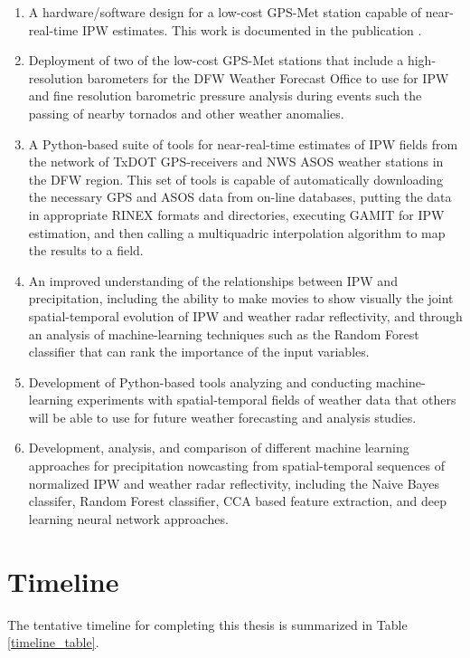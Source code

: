 \documentclass[proposal]{umassthesis}
\begin{document}
{\begin{enumerate}
\item A hardware/software design for a low-cost GPS-Met station capable of near-real-time IPW estimates. This work is documented in the publication \cite{nagarajan2015lowcost}.
\item Deployment of two of the low-cost GPS-Met stations that include a high-resolution barometers for the DFW Weather Forecast Office to use for IPW and fine resolution barometric pressure analysis during events such the passing of nearby tornados and other weather anomalies. 
\item A Python-based suite of tools for near-real-time estimates of IPW fields from the network of TxDOT GPS-receivers and NWS ASOS weather stations in the DFW region. This set of tools is capable of automatically downloading the necessary GPS and ASOS data from on-line databases, putting the data in appropriate RINEX formats and directories, executing GAMIT for IPW estimation, and then calling a multiquadric interpolation algorithm to map the results to a field.
\item An improved understanding of the relationships between IPW and precipitation, including the ability to make movies to show visually the joint spatial-temporal evolution of IPW and weather radar reflectivity, and through an analysis of machine-learning techniques such as the Random Forest classifier that can rank the importance of the input variables.
\item Development of Python-based tools analyzing and conducting machine-learning experiments with spatial-temporal fields of weather data that others will be able to use for future weather forecasting and analysis studies.
\item Development, analysis, and comparison of different machine learning approaches for precipitation nowcasting from spatial-temporal sequences of normalized IPW and weather radar reflectivity, including the Naive Bayes classifer, Random Forest classifier, CCA based feature extraction, and deep learning neural network approaches.  
\end{enumerate}

\section{Timeline}

The tentative timeline for completing this thesis is summarized in Table \ref{timeline_table}. 

}
\end{document}
